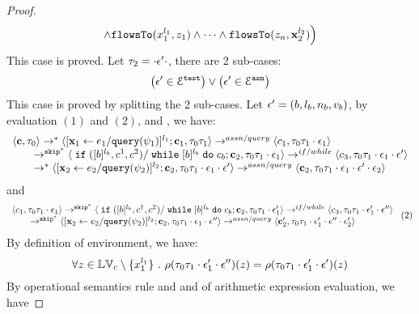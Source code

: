 \begin{proof}
\[ \land \mathtt{flowsTo}(x_1^{l_1}, z_1) \land \cdots \land \mathtt{flowsTo}(z_n, {\boldsymbol{\mathbf{x}}}_2^{l_2}) \Big)
\]
%
This case is proved.
%
%
Let $\mathtt{\tau}_2 = \cdot \mathtt{\epsilon}' \cdot$, there are 2 sub-cases: 
%
 \[
 \big(\mathtt{\epsilon}' \in \mathcal{E}^{\mathtt{{test}}}\big) \lor \big(\mathtt{\epsilon}' \in \mathcal{E}^{\mathtt{{asn}}}\big)
 \]
%
This case is proved by splitting the 2 sub-cases.
%
Let $\mathtt{\epsilon}' = (b, l_b, n_b, v_b)$, by evaluation $(1)$ and $(2)$, and , we have:
\[
  \begin{array}{l}   
\langle {\boldsymbol{\mathbf{c}}}, \mathtt{\tau}_0 \rangle \rightarrow^{*} 
\langle [\mathrel{ {\boldsymbol{\mathbf{x}}}_1 \leftarrow e_1 / {\tt query}(\psi_1) }]^{l_1} ; {\boldsymbol{\mathbf{c}}}_1, \mathtt{\tau}_0 \mathtt{\tau}_1 \rangle  
\rightarrow^{assn/query}
 \langle c_1, \mathtt{\tau}_0 \mathtt{\tau}_1 \cdot \mathtt{\epsilon}_1 \rangle 
 \\
  \qquad \rightarrow^{\mathtt{skip}^*} 
  \langle \;\mathtt{if}\; ([b]^{l_b}, c^1, c^2) / \;\mathtt{while}\; [b]^{l_b} \;\mathtt{do}\; c_b;{\boldsymbol{\mathbf{c}}}_2, 
  \mathtt{\tau}_0 \mathtt{\tau}_1 \cdot \mathtt{\epsilon}_1 \rangle 
 \rightarrow^{if / while} 
  \langle c_3, 
  \mathtt{\tau}_0 \mathtt{\tau}_1 \cdot \mathtt{\epsilon}_1 \cdot \mathtt{\epsilon}' \rangle 
  \\
  \qquad   \rightarrow^{*} 
  \langle [\mathrel{ {\boldsymbol{\mathbf{x}}}_2 \leftarrow e_2 / {\tt query}(\psi_2) }]^{l_2};{\boldsymbol{\mathbf{c}}}_2, 
  \mathtt{\tau}_0 \mathtt{\tau}_1 \cdot \mathtt{\epsilon}_1 \cdot \mathtt{\epsilon}' \rangle 
  \rightarrow^{assn/query} 
  \langle {\boldsymbol{\mathbf{c}}}_2,  \mathtt{\tau}_0 \mathtt{\tau}_1 \cdot \mathtt{\epsilon}_1 \cdot \mathtt{\epsilon}' \cdot \mathtt{\epsilon}_2 \rangle 
\end{array}
 \]
 and 
  \[
  \begin{array}{l}   
  \langle c_1, \mathtt{\tau}_0 \mathtt{\tau}_1 \cdot \mathtt{\epsilon}_1 \rangle 
  \rightarrow^{\mathtt{skip}^*} 
  \langle \;\mathtt{if}\; ([b]^{l_b}, c^1, c^2) / \;\mathtt{while}\; [b]^{l_b} \;\mathtt{do}\; c_b;{\boldsymbol{\mathbf{c}}}_2, 
  \mathtt{\tau}_0 \mathtt{\tau}_1 \cdot \mathtt{\epsilon}_1' \rangle 
  \rightarrow^{if / while} 
  \langle c_3, 
  \mathtt{\tau}_0 \mathtt{\tau}_1 \cdot \mathtt{\epsilon}_1' \cdot \mathtt{\epsilon}'' \rangle 
  \\
  \qquad \rightarrow^{\mathtt{skip}^*} 
  \langle [\mathrel{ {\boldsymbol{\mathbf{x}}}_2 \leftarrow e_2 / {\tt query}(\psi_2) }]^{l_2};{\boldsymbol{\mathbf{c}}}_2, 
  \mathtt{\tau}_0 \mathtt{\tau}_1 \cdot \mathtt{\epsilon}_1\cdot \mathtt{\epsilon}'' \rangle 
  \rightarrow^{assn/query} 
  \langle {\boldsymbol{\mathbf{c}}}_2',  \mathtt{\tau}_0 \mathtt{\tau}_1 \cdot \mathtt{\epsilon}_1' \cdot \mathtt{\epsilon}'' \cdot \mathtt{\epsilon}_2' \rangle 
\end{array} ~(2)
 \]
%
By definition of environment, we have:
\[
  \forall z \in \mathbb{LV}_c \setminus \{x_1^{l_1}\} ~.~
  \rho(\mathtt{\tau}_0 \mathtt{\tau}_1 \cdot \mathtt{\epsilon}_1' \cdot \mathtt{\epsilon}'') (z) =  
  \rho(\mathtt{\tau}_0 \mathtt{\tau}_1 \cdot \mathtt{\epsilon}_1' \cdot \mathtt{\epsilon}') (z)
\]
By operational semantics rule  and  and  of arithmetic expression evaluation, we have 

\end{proof}
